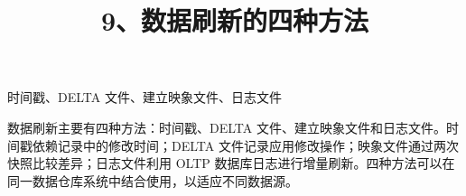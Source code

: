 \documentclass[UTF8,zihao=-4]{ctexart}
\begin{document}
\title{9、数据刷新的四种方法}
\author{}
\date{}
\maketitle

时间戳、DELTA 文件、建立映象文件、日志文件\par

数据刷新主要有四种方法：时间戳、DELTA 文件、建立映象文件和日志文件。时间戳依赖记录中的修改时间；DELTA 文件记录应用修改操作；映象文件通过两次快照比较差异；日志文件利用 OLTP 数据库日志进行增量刷新。四种方法可以在同一数据仓库系统中结合使用，以适应不同数据源。\par
\end{document}
